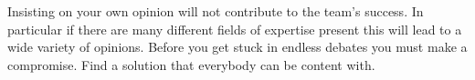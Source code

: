 \begin{multicols}{2}
Insisting on your own opinion will not contribute to the team’s success. In particular if there are many different fields of expertise present this will lead to a wide variety of opinions. Before you get stuck in endless debates you must make a compromise. Find a solution that everybody can be content with.
\end{multicols}